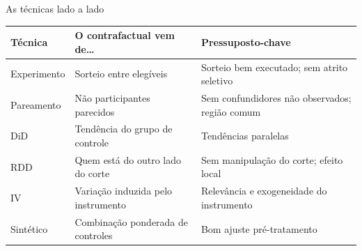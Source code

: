 \begin{frame}{As técnicas lado a lado}
  \scriptsize
  \renewcommand{\arraystretch}{1.25}
  \begin{tabularx}{\textwidth}{@{}p{1.6cm}>{\raggedright\arraybackslash}X>{\raggedright\arraybackslash}X@{}}
    \toprule
    \textbf{Técnica} & \textbf{O contrafactual vem de\ldots} & \textbf{Pressuposto-chave} \\ \midrule
    Experimento & Sorteio entre elegíveis & Sorteio bem executado; sem atrito seletivo \\
    Pareamento & Não participantes parecidos & Sem confundidores não observados; região comum \\
    DiD & Tendência do grupo de controle & Tendências paralelas \\
    RDD & Quem está do outro lado do corte & Sem manipulação do corte; efeito local \\
    IV & Variação induzida pelo instrumento & Relevância e exogeneidade do instrumento \\
    Sintético & Combinação ponderada de controles & Bom ajuste pré-tratamento \\ \bottomrule
  \end{tabularx}
\end{frame}
